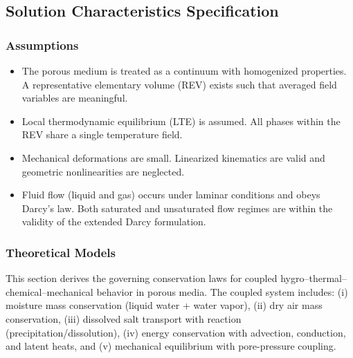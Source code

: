 \documentclass[12pt]{article}
\newcounter{assumpnum} %
\begin{document}
\subsection{Solution Characteristics Specification}

\subsubsection{Assumptions} \label{sec_assumpt}

\begin{itemize}

\item[A\refstepcounter{assumpnum}\theassumpnum \label{A_Continuum}:]
The porous medium is treated as a continuum with homogenized properties. A representative elementary volume (REV) exists such that averaged field variables are meaningful.

\item[A\refstepcounter{assumpnum}\theassumpnum \label{A_LTE}:]
Local thermodynamic equilibrium (LTE) is assumed. All phases within the REV share a single temperature field.

\item[A\refstepcounter{assumpnum}\theassumpnum \label{A_SmallStrain}:]
Mechanical deformations are small. Linearized kinematics are valid and geometric nonlinearities are neglected.

\item[A\refstepcounter{assumpnum}\theassumpnum \label{A_DarcyValidity}:]
Fluid flow (liquid and gas) occurs under laminar conditions and obeys Darcy’s law. Both saturated and unsaturated flow regimes are within the validity of the extended Darcy formulation.

\end{itemize}


\subsubsection{Theoretical Models}\label{sec_theoretical}

This section derives the governing conservation laws for coupled
hygro--thermal--chemical--mechanical behavior in porous media. The coupled system includes:
(i) moisture mass conservation (liquid water + water vapor), (ii) dry air mass conservation,
(iii) dissolved salt transport with reaction (precipitation/dissolution),
(iv) energy conservation with advection, conduction, and latent heats, and
(v) mechanical equilibrium with pore-pressure coupling.
\end{document}

